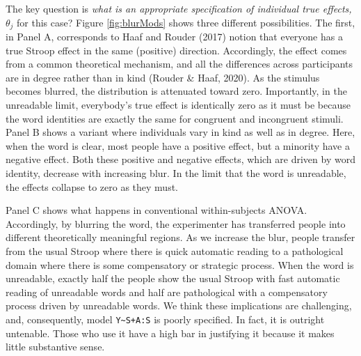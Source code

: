 \documentclass[
  english,
  ,man]{apa6}
\begin{document}
The key question is \emph{what is an appropriate specification of individual true effects, \(\theta_j\)} for this case? Figure \ref{fig:blurMods} shows three different possibilities. The first, in Panel A, corresponds to Haaf and Rouder (2017) notion that everyone has a true Stroop effect in the same (positive) direction. Accordingly, the effect comes from a common theoretical mechanism, and all the differences across participants are in degree rather than in kind (Rouder \& Haaf, 2020). As the stimulus becomes blurred, the distribution is attenuated toward zero. Importantly, in the unreadable limit, everybody's true effect is identically zero as it must be because the word identities are exactly the same for congruent and incongruent stimuli. Panel B shows a variant where individuals vary in kind as well as in degree. Here, when the word is clear, most people have a positive effect, but a minority have a negative effect. Both these positive and negative effects, which are driven by word identity, decrease with increasing blur. In the limit that the word is unreadable, the effects collapse to zero as they must.

Panel C shows what happens in conventional within-subjects ANOVA. Accordingly, by blurring the word, the experimenter has transferred people into different theoretically meaningful regions. As we increase the blur, people transfer from the usual Stroop where there is quick automatic reading to a pathological domain where there is some compensatory or strategic process. When the word is unreadable, exactly half the people show the usual Stroop with fast automatic reading of unreadable words and half are pathological with a compensatory process driven by unreadable words. We think these implications are challenging, and, consequently, model \texttt{Y\textasciitilde{}S+A:S} is poorly specified. In fact, it is outright untenable. Those who use it have a high bar in justifying it because it makes little substantive sense.
\end{document}
